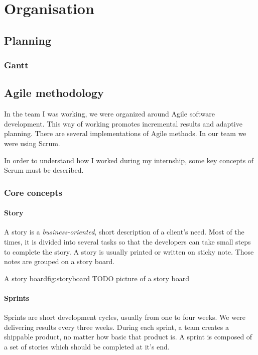 \chapter{Organisation}

\section{Planning}
\subsection{Gantt}
%

\section{Agile methodology}

In the team I was working, we were organized around Agile software
development. This way of working promotes incremental results and adaptive planning.
There are several implementations of Agile methods. In our team we were using Scrum.

In order to understand how I worked during my internship, some key concepts of Scrum must be described.

\subsection{Core concepts}

\subsubsection{Story}\label{sec:story}
A story is a \emph{business-oriented}, short description of a client's
need. Most of the times, it is divided into several tasks so that the developers
can take small steps to complete the story. A story is usually printed or
written on sticky note. Those notes are grouped on a story board.

\begin{figureGraphics}{A story board}{fig:storyboard}
    TODO picture of a story board
\end{figureGraphics}


\subsubsection{Sprints}\label{sec:sprint}
Sprints are short development cycles, usually from one to four weeks. We were
delivering results every three weeks. During each sprint, a team creates a
shippable product, no matter how basic that product is. A sprint is composed of
a set of stories which should be completed at it's end.

